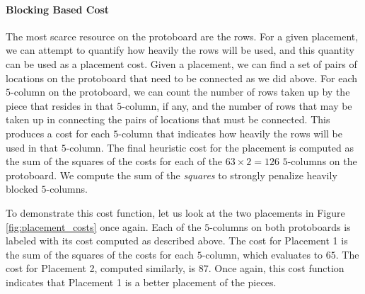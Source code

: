\paragraph{Blocking Based Cost}
The most scarce resource on the protoboard are the rows.
For a given placement, we can attempt to quantify how heavily
the rows will be used, and this quantity can be used as a placement cost.
Given a placement, we can find a set of pairs of locations on the protoboard
that need to be connected as we did above. For each $5$-column on
the protoboard, we can count the number of rows taken up by the piece that
resides in that $5$-column, if any, and the number of rows that may be taken
up in connecting the pairs of locations that must be connected. This produces
a cost for each $5$-column that indicates how heavily the rows will be used
in that $5$-column. The final heuristic cost for the placement is computed
as the sum of the squares of the costs for each of the $63 \times 2 = 126$
$5$-columns on the protoboard. We compute the sum of the \emph{squares} to
strongly penalize heavily blocked $5$-columns.

To demonstrate this cost function, let us look at the two placements in Figure
\ref{fig:placement_costs} once again. Each of the $5$-columns on both
protoboards is labeled with its cost computed as described above.
The cost for Placement 1 is the sum of the squares of the costs for each
$5$-column, which
evaluates to $65$. The cost for Placement 2, computed similarly, is $87$. Once
again, this cost function indicates that Placement 1 is a better placement of
the pieces.

